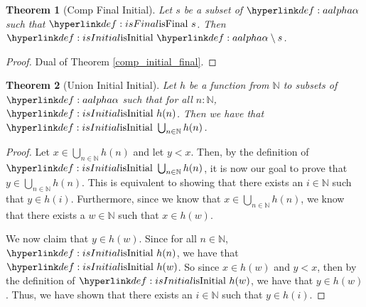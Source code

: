 \documentclass{article}
\newtheorem{theorem}{Theorem}
\theoremstyle{definition}
\newcommand{\N}{\mathbb{N}}
\begin{document}
\begin{theorem}[Comp Final Initial]
\label{comp_final_initial}
Let $s$ be a subset of $\aalpha$ such that $\isFinal{s}$. Then $\isInitial{\aalpha\setminus s}$.
\end{theorem}
\begin{proof}
Dual of Theorem \ref{comp_initial_final}.
\end{proof}

\begin{theorem}[Union Initial Initial]
\label{union_initial_initial}
Let $h$ be a function from $\N$ to subsets of $\aalpha$ such that for all $n : \N$, $\isInitial{h(n)}$. Then we have that $\isInitial{\bigcup_{n\in \N} h(n)}$.
\end{theorem}
\begin{proof}
Let $x\in \bigcup_{n\in \N} h(n)$ and let $y < x$. Then, by the definition of $\isInitial{\bigcup_{n\in \N} h(n)}$, it is now our goal to prove that $y\in \bigcup_{n\in \N} h(n)$. This is equivalent to showing that there exists an $i\in \N$ such that $y \in h(i)$. Furthermore, since we know that $x\in \bigcup_{n\in \N} h(n)$, we know that there exists a $w\in \N$ such that $x\in h(w)$.

We now claim that $y \in h(w)$. Since for all $n\in \N$, $\isInitial{h(n)}$, we have that $\isInitial{h(w)}$. So since $x\in h(w)$ and $y < x$, then by the definition of $\isInitial{h(w)}$, we have that $y\in h(w)$. Thus, we have shown that there exists an $i\in \N$ such that $y\in h(i)$.
\end{proof}
\end{document}
